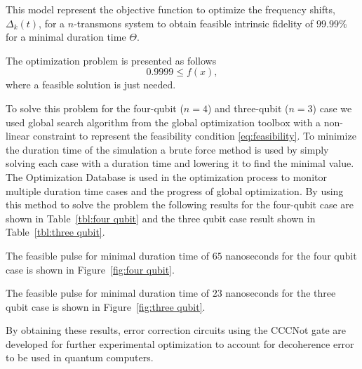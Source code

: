 This model represent the objective function to optimize the frequency shifts, $\Delta_k(t)$, for a $n$-transmons system to obtain feasible intrinsic fidelity of $99.99\%$ for a minimal duration time $\Theta$.

The optimization problem is presented as follows
\begin{equation}
    \label{eq:feasibility}
    0.9999 \leq f(x),
\end{equation}
where a feasible solution is just needed. 

To solve this problem for the four-qubit ($n=4$) and three-qubit ($n=3$) case we used  global search algorithm from the global optimization toolbox with a non-linear constraint to represent the feasibility condition \eqref{eq:feasibility}. To minimize the duration time of the simulation a brute force method is used by simply solving each case with a duration time and lowering it to find the minimal value. The Optimization Database is used in the optimization process to
monitor multiple duration time cases and the progress of global optimization. By using this method to solve the problem the following results for the four-qubit case are shown in Table~\ref{tbl:four qubit} and the three qubit case result shown in Table~\ref{tbl:three qubit}. 



The feasible pulse for minimal duration time of $65$ nanoseconds for the four qubit case is shown in Figure~\ref{fig:four qubit}.


The feasible pulse for minimal duration time of $23$ nanoseconds for the three qubit case is shown in Figure~\ref{fig:three qubit}.


By obtaining these results, error correction circuits using the CCCNot gate are developed for further experimental optimization to account for decoherence error to be used in quantum computers.
